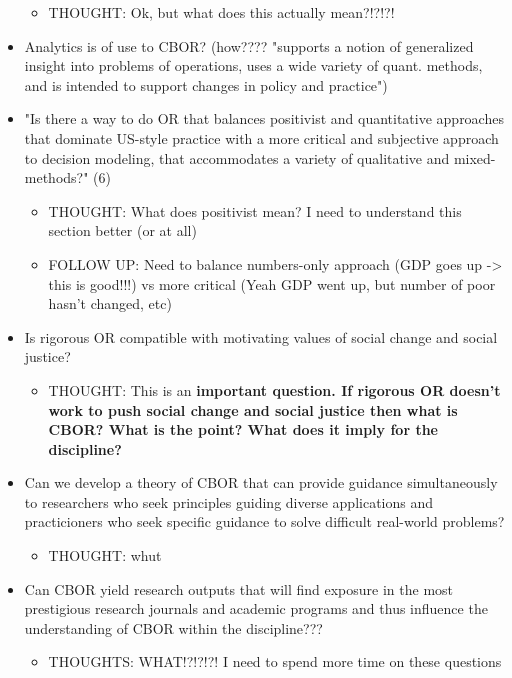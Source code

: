 \documentclass{article}
\begin{document}
\begin{itemize}
	\begin{itemize}
	\item THOUGHT: Ok, but what does this actually mean?!?!?!
	\end{itemize}
\item Analytics is of use to CBOR? (how???? "supports a notion of generalized insight into problems of operations, uses a wide variety of quant. methods, and is intended to support changes in policy and practice")
\item "Is there a way to do OR that balances positivist and quantitative approaches that dominate US-style practice with a more critical and subjective approach to decision modeling, that accommodates a variety of qualitative and mixed-methods?" (6)
	\begin{itemize}
	\item THOUGHT: What does positivist mean? I need to understand this section better (or at all)
    \item FOLLOW UP: Need to balance numbers-only approach (GDP goes up -> this is good!!!) vs more critical (Yeah GDP went up, but number of poor hasn't changed, etc)
	\end{itemize}
\item Is rigorous OR compatible with motivating values of social change and social justice?
	\begin{itemize}
	\item THOUGHT: This is an \bf{important} question. If rigorous OR doesn't work to push social change and social justice then what is CBOR? What is the point? What does it imply for the discipline?
	\end{itemize}
\item Can we develop a theory of CBOR that can provide guidance simultaneously to researchers who seek principles guiding diverse applications and practicioners who seek specific guidance to solve difficult real-world problems?
	\begin{itemize}
	\item THOUGHT: whut 
	\end{itemize}
\item Can CBOR yield research outputs that will find exposure in the most prestigious research journals and academic programs and thus influence the understanding of CBOR within the discipline???
	\begin{itemize}
	\item THOUGHTS: WHAT!?!?!?! I need to spend more time on these questions
	\end{itemize}
\end{itemize}
\end{document}
